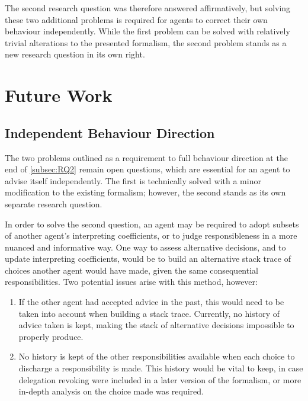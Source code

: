 The second research question was therefore answered affirmatively, but solving these two additional problems is required for agents to correct their own behaviour independently. While the first problem can be solved with relatively trivial alterations to the presented formalism, the second problem stands as a new research question in its own right.\par

\section{Future Work}\label{sec:future_work}

\subsection{Independent Behaviour Direction}
The two problems outlined as a requirement to full behaviour direction at the end of \cref{subsec:RQ2} remain open questions, which are essential for an agent to advise itself independently. The first is technically solved with a minor modification to the existing formalism; however, the second stands as its own separate research question.\par

In order to solve the second question, an agent may be required to adopt subsets of another agent's interpreting coefficients, or to judge responsibleness in a more nuanced and informative way. One way to assess alternative decisions, and to update interpreting coefficients, would be to build an alternative stack trace of choices another agent would have made, given the same consequential responsibilities. Two potential issues arise with this method, however:

\begin{enumerate}
    \item If the other agent had accepted advice in the past, this would need to be taken into account when building a stack trace. Currently, no history of advice taken is kept, making the stack of alternative decisions impossible to properly produce.\par
    \item No history is kept of the other responsibilities available when each choice to discharge a responsibility is made. This history would be vital to keep, in case delegation revoking were included in a later version of the formalism, or more in-depth analysis on the choice made was required.\par
\end{enumerate}

